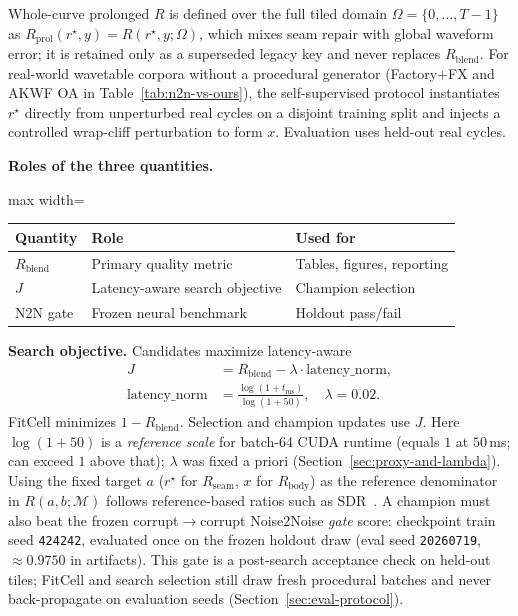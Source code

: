 Whole-curve prolonged $R$ is defined over the full tiled domain $\Omega{=}\{0,\dots,T{-}1\}$ as $R_{\mathrm{prol}}(r^{\star},y)=R(r^{\star},y;\Omega)$, which mixes seam repair with global waveform error; it is retained only as a superseded legacy key and never replaces $R_{\mathrm{blend}}$.
For real-world wavetable corpora without a procedural generator (Factory+FX and AKWF OA in Table~\ref{tab:n2n-vs-ours}), the self-supervised protocol instantiates $r^{\star}$ directly from unperturbed real cycles on a disjoint training split and injects a controlled wrap-cliff perturbation to form $x$. Evaluation uses held-out real cycles.

\textbf{Roles of the three quantities.}
\begin{center}
\small
\begin{adjustbox}{max width=\columnwidth}
\begin{tabular}{@{}lll@{}}
\toprule
Quantity & Role & Used for \\
\midrule
$R_{\mathrm{blend}}$ & Primary quality metric & Tables, figures, reporting \\
$J$ & Latency-aware search objective & Champion selection \\
N2N gate & Frozen neural benchmark & Holdout pass/fail \\
\bottomrule
\end{tabular}
\end{adjustbox}
\end{center}

\textbf{Search objective.}
Candidates maximize latency-aware
\begin{equation}
\label{eq:outer-obj}
\begin{aligned}
J&=R_{\mathrm{blend}}-\lambda\cdot\mathrm{latency\_norm},\\
\mathrm{latency\_norm}
&=\frac{\log(1+t_{\mathrm{ms}})}{\log(1+50)},
\quad \lambda=0.02.
\end{aligned}
\end{equation}
FitCell minimizes $1-R_{\mathrm{blend}}$. Selection and champion updates use $J$.
Here $\log(1+50)$ is a \emph{reference scale} for batch-64 CUDA runtime (equals $1$ at $50$\,ms; can exceed $1$ above that); $\lambda$ was fixed a priori (Section~\ref{sec:proxy-and-lambda}).
Using the fixed target $a$ ($r^{\star}$ for $R_{\mathrm{seam}}$, $x$ for $R_{\mathrm{body}}$) as the reference denominator in $R(a,b;\mathcal{M})$ follows reference-based ratios such as SDR~\cite{purwins2019}.
A champion must also beat the frozen corrupt$\to$corrupt Noise2Noise \emph{gate} score: checkpoint train seed \texttt{424242}, evaluated once on the frozen holdout draw (eval seed \texttt{20260719}, ${\approx}0.9750$ in artifacts).
This gate is a post-search acceptance check on held-out tiles; FitCell and search selection still draw fresh procedural batches and never back-propagate on evaluation seeds (Section~\ref{sec:eval-protocol}).

